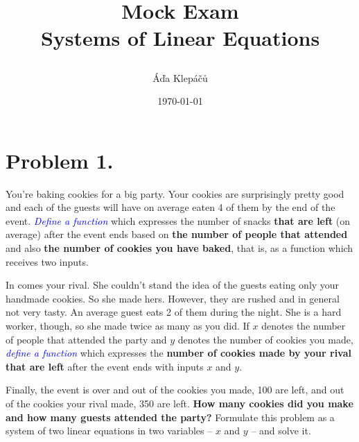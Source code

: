 \documentclass[a4paper,11pt]{article}
\title{\Huge\textsf{Mock Exam}\\
 \Large\textsf{Systems of Linear Equations}
 \author{Áďa Klepáčů}
 \date{\today}
}
\newcommand{\tb}{\textcolor{blue}}
\begin{document}
\maketitle
\thispagestyle{fancy}

\section*{Problem 1.}

You're baking cookies for a big party. Your cookies are surprisingly pretty good
and each of the guests will have on average eaten 4 of them by the end of the
event. \emph{\tb{Define a function}} which expresses the number of snacks
\textbf{that are left} (on average) after the event ends based on \textbf{the
number of people that attended} and also \textbf{the number of cookies you have
baked}, that is, as a function which receives two inputs.

In comes your rival. She couldn't stand the idea of the guests eating only your
handmade cookies. So she made hers. However, they are rushed and in general not
very tasty. An average guest eats 2 of them during the night. She is a hard
worker, though, so she made twice as many as you did. If $x$ denotes the number
of people that attended the party and $y$ denotes the number of cookies you
made, \emph{\tb{define a function}} which expresses the \textbf{number of
cookies made by your rival that are left} after the event ends with inputs $x$
and $y$.

Finally, the event is over and out of the cookies you made, 100 are left, and
out of the cookies your rival made, 350 are left. \textbf{How many cookies did
you make and how many guests attended the party?} Formulate this problem as a
system of two linear equations in two variables -- $x$ and $y$ -- and solve it.
\end{document}
